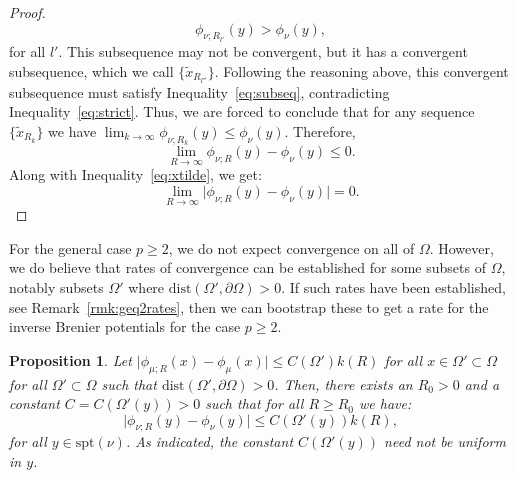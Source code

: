 \documentclass{amsart}
\theoremstyle{lemma}
\newtheorem{proposition}[theorem]{Proposition}
\theoremstyle{remark}
\begin{document}
\begin{proof}
\begin{equation}
\phi_{\nu;R_{l'}}(y) > \phi_{\nu}(y),
\end{equation}
for all $l'$. This subsequence may not be convergent, but it has a convergent subsequence, which we call $\{ \tilde{x}_{R_{l''}} \}$. Following the reasoning above, this convergent subsequence must satisfy Inequality~\eqref{eq:subseq}, contradicting Inequality~\eqref{eq:strict}. Thus, we are forced to conclude that for any sequence $\{ \tilde{x}_{R_{k}} \}$ we have $\lim_{k \rightarrow \infty} \phi_{\nu;R_{k}}(y) \leq \phi_{\nu}(y)$. Therefore,
\begin{equation}
\lim_{R \rightarrow \infty} \phi_{\nu;R}(y) - \phi_{\nu}(y) \leq 0.
\end{equation}
Along with Inequality~\eqref{eq:xtilde}, we get:
\begin{equation}
\lim_{R \rightarrow \infty} \vert \phi_{\nu;R}(y) - \phi_{\nu}(y) \vert = 0.
\end{equation}

\end{proof}

For the general case $p \geq 2$, we do not expect convergence on all of $\Omega$. However, we do believe that rates of convergence can be established for some subsets of $\Omega$, notably subsets $\Omega '$ where $\text{dist}(\Omega ', \partial \Omega)>0$. If such rates have been established, see Remark~\ref{rmk:geq2rates}, then we can bootstrap these to get a rate for the inverse Brenier potentials for the case $p \geq 2$.

\begin{proposition}\label{prop:bootstrap}
Let $\vert \phi_{\mu;R}(x) - \phi_{\mu}(x) \vert \leq C(\Omega ')k(R)$ for all $x \in \Omega' \subset \Omega$ for all $\Omega ' \subset \Omega$ such that $\text{dist}(\Omega ', \partial \Omega)>0$. Then, there exists an $R_0>0$ and a constant $C = C(\Omega '(y))>0$ such that for all $R \geq R_0$ we have:
\begin{equation}
\vert \phi_{\nu;R}(y) - \phi_{\nu}(y) \vert \leq C(\Omega '(y))k(R),
\end{equation}
for all $y \in \text{spt}(\nu)$. As indicated, the constant $C(\Omega '(y))$ need not be uniform in $y$.
\end{proposition}
\end{document}
